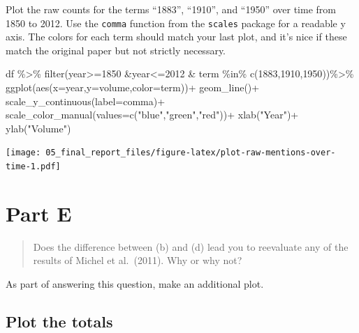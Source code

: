 \documentclass[
]{article}
\newenvironment{Shaded}{\begin{snugshade}}{\end{snugshade}}
\newcommand{\AttributeTok}[1]{\textcolor[rgb]{0.77,0.63,0.00}{#1}}
\newcommand{\DecValTok}[1]{\textcolor[rgb]{0.00,0.00,0.81}{#1}}
\newcommand{\FunctionTok}[1]{\textcolor[rgb]{0.00,0.00,0.00}{#1}}
\newcommand{\NormalTok}[1]{#1}
\newcommand{\SpecialCharTok}[1]{\textcolor[rgb]{0.00,0.00,0.00}{#1}}
\newcommand{\StringTok}[1]{\textcolor[rgb]{0.31,0.60,0.02}{#1}}
\begin{document}
Plot the raw counts for the terms ``1883'', ``1910'', and ``1950'' over
time from 1850 to 2012. Use the \texttt{comma} function from the
\texttt{scales} package for a readable y axis. The colors for each term
should match your last plot, and it's nice if these match the original
paper but not strictly necessary.

\begin{Shaded}
\begin{Highlighting}[]
\NormalTok{df }\SpecialCharTok{\%\textgreater{}\%} 
  \FunctionTok{filter}\NormalTok{(year}\SpecialCharTok{\textgreater{}=}\DecValTok{1850} \SpecialCharTok{\&}\NormalTok{year}\SpecialCharTok{\textless{}=}\DecValTok{2012} \SpecialCharTok{\&}\NormalTok{ term }\SpecialCharTok{\%in\%} \FunctionTok{c}\NormalTok{(}\DecValTok{1883}\NormalTok{,}\DecValTok{1910}\NormalTok{,}\DecValTok{1950}\NormalTok{))}\SpecialCharTok{\%\textgreater{}\%}
  \FunctionTok{ggplot}\NormalTok{(}\FunctionTok{aes}\NormalTok{(}\AttributeTok{x=}\NormalTok{year,}\AttributeTok{y=}\NormalTok{volume,}\AttributeTok{color=}\NormalTok{term))}\SpecialCharTok{+}
    \FunctionTok{geom\_line}\NormalTok{()}\SpecialCharTok{+}
    \FunctionTok{scale\_y\_continuous}\NormalTok{(}\AttributeTok{label=}\NormalTok{comma)}\SpecialCharTok{+}
    \FunctionTok{scale\_color\_manual}\NormalTok{(}\AttributeTok{values=}\FunctionTok{c}\NormalTok{(}\StringTok{"blue"}\NormalTok{,}\StringTok{"green"}\NormalTok{,}\StringTok{"red"}\NormalTok{))}\SpecialCharTok{+}
    \FunctionTok{xlab}\NormalTok{(}\StringTok{"Year"}\NormalTok{)}\SpecialCharTok{+}
    \FunctionTok{ylab}\NormalTok{(}\StringTok{"Volume"}\NormalTok{)}
\end{Highlighting}
\end{Shaded}

\texttt{[image: 05\_final\_report\_files/figure-latex/plot-raw-mentions-over-time-1.pdf]}

\hypertarget{part-e}{%
\section{Part E}\label{part-e}}

\begin{quote}
Does the difference between (b) and (d) lead you to reevaluate any of
the results of Michel et al.~(2011). Why or why not?
\end{quote}

As part of answering this question, make an additional plot.

\hypertarget{plot-the-totals}{%
\subsection{Plot the totals}\label{plot-the-totals}}
\end{document}

